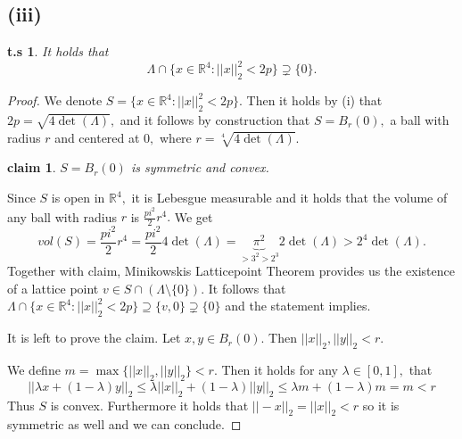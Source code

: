 \documentclass[10pt,a4paper]{article}
\newtheorem*{zz*}{t.s}
\newtheorem*{claim*}{claim}
\newcommand{\RR}{\mathbb{R}}
\begin{document}
\subsection*{(iii)}
	\begin{zz*}
		It holds that
		\[\Lambda\cap \{x\in \RR^4: ||x||_2^2< 2p\}\supsetneq \{0\}.\]
	\end{zz*}
	\begin{proof}
		We denote $S =  \{x\in \RR^4: ||x||_2^2< 2p\}.$ Then it holds by (i) that $2p = \sqrt{4\det(\Lambda)},$ and it follows by construction that $S = B_r(0),$ a ball with radius $r$ and centered at $0,$ where $r = \sqrt[4]{4\det(\Lambda)}.$
		\begin{claim*}
			$S = B_r(0)$ is symmetric and convex.
		\end{claim*}
		Since $S$ is open in $\RR^4,$ it is Lebesgue measurable and it holds that the volume of any ball with radius $r$ is $\frac{pi^2}{2}r^4.$ We get
		\[vol(S) = \frac{pi^2}{2}r^4 = \frac{pi^2}{2}4\det(\Lambda) = \underbrace{\pi^2}_{>3^2> 2^3}2\det(\Lambda)> 2^4\det(\Lambda).\]
		Together with claim, Minikowskis Latticepoint Theorem provides us the existence of a lattice point $v\in S\cap (\Lambda\setminus\{0\}).$ It follows that $\Lambda\cap \{x\in \RR^4: ||x||_2^2< 2p\}\supseteq \{v,0\} \supsetneq \{0\}$ and the statement implies. \vspace{0.1cm}
		
		It is left to prove the claim.
		Let $x,y\in B_r(0).$ Then $||x||_2, ||y||_2< r.$  
		
		We define $m = \max\{||x||_2, ||y||_2\}< r.$ Then it holds for any $\lambda \in [0,1],$ that
		\[||\lambda x + (1-\lambda)y||_2 \leq \lambda||x||_2 + (1-\lambda)||y||_2\leq \lambda m+ (1-\lambda)m = m<r\]
		Thus $S$ is convex. Furthermore it holds that $||-x||_2 = ||x||_2< r$ so it is symmetric as well and we can conclude.
	\end{proof}
\end{document}
